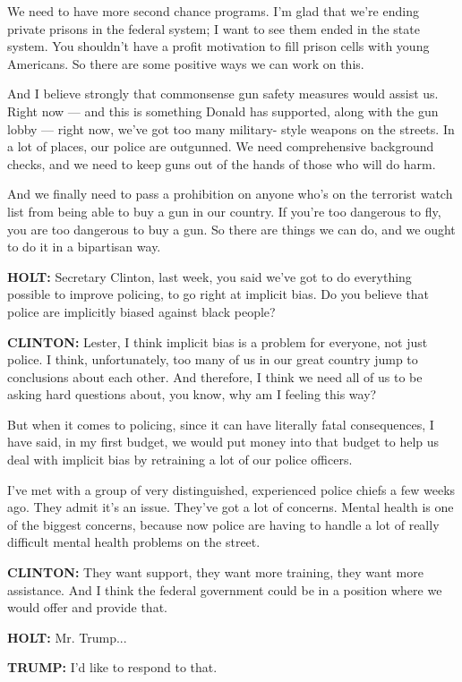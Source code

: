We need to have more second chance programs. I'm glad that we're ending
private prisons in the federal system; I want to see them ended in the
state system. You shouldn't have a profit motivation to fill prison
cells with young Americans. So there are some positive ways we can work
on this.

And I believe strongly that commonsense gun safety measures would assist
us. Right now --- and this is something Donald has supported, along with
the gun lobby --- right now, we've got too many military- style weapons
on the streets. In a lot of places, our police are outgunned. We need
comprehensive background checks, and we need to keep guns out of the
hands of those who will do harm.

And we finally need to pass a prohibition on anyone who's on the
terrorist watch list from being able to buy a gun in our country. If
you're too dangerous to fly, you are too dangerous to buy a gun. So
there are things we can do, and we ought to do it in a bipartisan way.

\textbf{HOLT:} Secretary Clinton, last week, you said we've got to do
everything possible to improve policing, to go right at implicit bias.
Do you believe that police are implicitly biased against black people?

\textbf{CLINTON:} Lester, I think implicit bias is a problem for
everyone, not just police. I think, unfortunately, too many of us in our
great country jump to conclusions about each other. And therefore, I
think we need all of us to be asking hard questions about, you know, why
am I feeling this way?

But when it comes to policing, since it can have literally fatal
consequences, I have said, in my first budget, we would put money into
that budget to help us deal with implicit bias by retraining a lot of
our police officers.

I've met with a group of very distinguished, experienced police chiefs a
few weeks ago. They admit it's an issue. They've got a lot of concerns.
Mental health is one of the biggest concerns, because now police are
having to handle a lot of really difficult mental health problems on the
street.

\textbf{CLINTON:} They want support, they want more training, they want
more assistance. And I think the federal government could be in a
position where we would offer and provide that.

\textbf{HOLT:} Mr. Trump...

\textbf{TRUMP:} I'd like to respond to that.

